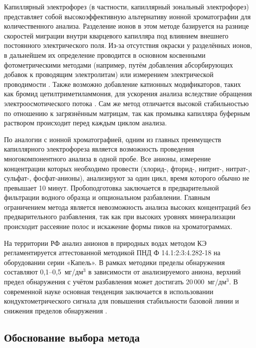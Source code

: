 Капиллярный электрофорез (в частности, капиллярный зональный электрофорез) представляет собой высокоэффективную альтернативу ионной хроматографии для количественного анализа. Разделение ионов в этом методе базируется на разнице скоростей миграции внутри кварцевого капилляра под влиянием внешнего постоянного электрического поля. Из-за отсутствия окраски у разделённых ионов, в дальнейшем их определение проводится в основном косвенными фотометрическими методами (например, путём добавления абсорбирующих добавок к проводящим электролитам) или измерением электрической проводимости \cite{pobozyApplicationCapillaryElectrophoresis2021b, hauserContactlessConductivityDetection2025, zhangAnalysisEnvironmentalPollutants2023}. Также возможно добавление катионных модификаторов, таких как бромид цетилтриметиламмония, для ускорения анализа вследствие обращения электроосмотического потока \cite{pobozyApplicationCapillaryElectrophoresis2021b}. Сам же метод отличается высокой стабильностью по отношению к загрязнённым матрицам, так как промывка капилляра буферным раствором происходит перед каждым циклом анализа.

По аналогии с ионной хроматографией, одним из главных преимуществ капиллярного электрофореза является возможность проведения многокомпонентного анализа в одной пробе. Все анионы, измерение концентрации которых необходимо провести (хлорид-, фторид-, нитрит-, нитрат-, сульфат-, фосфат-анионы), анализируют за один цикл, время которого обычно не превышает 10 минут. Пробоподготовка заключается в предварительной фильтрации водного образца и опциональном разбавлении. Главным ограничением метода является невозможность анализа высоких концентраций без предварительного разбавления, так как при высоких уровнях минерализации происходит рассеяние полос и искажение формы пиков на хроматограммах.

На территории РФ анализ анионов в природных водах методом КЭ регламентируется аттестованной методикой ПНД Ф 14.1:2:3:4.282-18 \cite{pndf14123428218} на оборудовании серии «Капель». В рамках методики пределы обнаружения составляют 0,1--0,5~мг/дм$^3$ в зависимости от анализируемого аниона, верхний предел обнаружения с учётом разбавления может достигать 20\,000~мг/дм$^3$. В современной науке основная тенденция заключается в использовании кондуктометрического сигнала для повышения стабильности базовой линии и снижения пределов обнаружения \cite{liPushingLimitsCapacitively2024}.

\subsection{Обоснование выбора метода}

